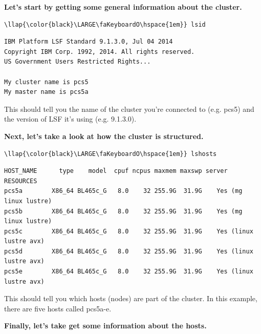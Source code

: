 \documentclass[11pt]{article}
\begin{document}
\textbf{Let's start by getting some general information about the
cluster.}

\begin{terminalinput}
\begin{Verbatim}[commandchars=\\\{\}]
\llap{\color{black}\LARGE\faKeyboardO\hspace{1em}} lsid
\end{Verbatim}
\end{terminalinput}


    \begin{verbatim}
IBM Platform LSF Standard 9.1.3.0, Jul 04 2014
Copyright IBM Corp. 1992, 2014. All rights reserved.
US Government Users Restricted Rights...

My cluster name is pcs5
My master name is pcs5a
\end{verbatim}

    This should tell you the name of the cluster you're connected to (e.g.
pcs5) and the version of LSF it's using (e.g. 9.1.3.0).

    \textbf{Next, let's take a look at how the cluster is structured.}

\begin{terminalinput}
\begin{Verbatim}[commandchars=\\\{\}]
\llap{\color{black}\LARGE\faKeyboardO\hspace{1em}} lshosts
\end{Verbatim}
\end{terminalinput}


    \begin{verbatim}
HOST_NAME      type    model  cpuf ncpus maxmem maxswp server RESOURCES
pcs5a        X86_64 BL465c_G   8.0    32 255.9G  31.9G    Yes (mg linux lustre)
pcs5b        X86_64 BL465c_G   8.0    32 255.9G  31.9G    Yes (mg linux lustre)
pcs5c        X86_64 BL465c_G   8.0    32 255.9G  31.9G    Yes (linux lustre avx)
pcs5d        X86_64 BL465c_G   8.0    32 255.9G  31.9G    Yes (linux lustre avx)
pcs5e        X86_64 BL465c_G   8.0    32 255.9G  31.9G    Yes (linux lustre avx)
\end{verbatim}

    This should tell you which hosts (nodes) are part of the cluster. In
this example, there are five hosts called pcs5a-e.

\newpage

    \textbf{Finally, let's take get some information about the hosts.}
\end{document}
